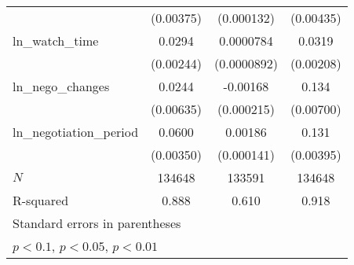 {\begin{tabular}{l*{3}{c}}
            &   (0.00375)         &  (0.000132)         &   (0.00435)         \\
\addlinespace
ln\_watch\_time&      0.0294\sym{***}&   0.0000784         &      0.0319\sym{***}\\
            &   (0.00244)         & (0.0000892)         &   (0.00208)         \\
\addlinespace
ln\_nego\_changes&      0.0244\sym{***}&    -0.00168\sym{***}&       0.134\sym{***}\\
            &   (0.00635)         &  (0.000215)         &   (0.00700)         \\
\addlinespace
ln\_negotiation\_period&      0.0600\sym{***}&     0.00186\sym{***}&       0.131\sym{***}\\
            &   (0.00350)         &  (0.000141)         &   (0.00395)         \\
\midrule
\(N\)       &      134648         &      133591         &      134648         \\
R-squared   &       0.888         &       0.610         &       0.918         \\
\bottomrule
\multicolumn{4}{l}{\footnotesize Standard errors in parentheses}\\
\multicolumn{4}{l}{\footnotesize \sym{*} \(p<0.1\), \sym{**} \(p<0.05\), \sym{***} \(p<0.01\)}\\
\end{tabular}
}
